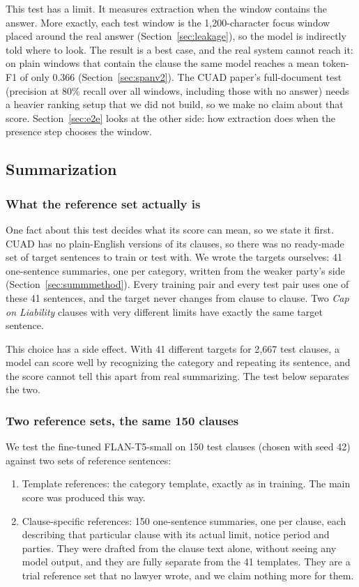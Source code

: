 This test has a limit. It measures extraction when the window contains the answer. More exactly, each test window is the 1{,}200-character focus window placed around the real answer (Section~\ref{sec:leakage}), so the model is indirectly told where to look. The result is a best case, and the real system cannot reach it: on plain windows that contain the clause the same model reaches a mean token-F1 of only 0.366 (Section~\ref{sec:spanv2}). The CUAD paper's full-document test (precision at 80\% recall over all windows, including those with no answer) needs a heavier ranking setup that we did not build, so we make no claim about that score. Section~\ref{sec:e2e} looks at the other side: how extraction does when the presence step chooses the window.
\subsection{Summarization}
\label{sec:summ}

\subsubsection{What the reference set actually is}
One fact about this test decides what its score can mean, so we state it first. CUAD has no plain-English versions of its clauses, so there was no ready-made set of target sentences to train or test with. We wrote the targets ourselves: 41 one-sentence summaries, one per category, written from the weaker party's side (Section~\ref{sec:summmethod}). Every training pair and every test pair uses one of these 41 sentences, and the target never changes from clause to clause. Two \emph{Cap on Liability} clauses with very different limits have exactly the same target sentence.

This choice has a side effect. With 41 different targets for 2{,}667 test clauses, a model can score well by recognizing the category and repeating its sentence, and the score cannot tell this apart from real summarizing. The test below separates the two.

\subsubsection{Two reference sets, the same 150 clauses}
We test the fine-tuned FLAN-T5-small on 150 test clauses (chosen with seed 42) against two sets of reference sentences:

\begin{enumerate}[itemsep=2pt]
  \item Template references: the category template, exactly as in training. The main score was produced this way.
  \item Clause-specific references: 150 one-sentence summaries, one per clause, each describing that particular clause with its actual limit, notice period and parties. They were drafted from the clause text alone, without seeing any model output, and they are fully separate from the 41 templates. They are a trial reference set that no lawyer wrote, and we claim nothing more for them.
\end{enumerate}


